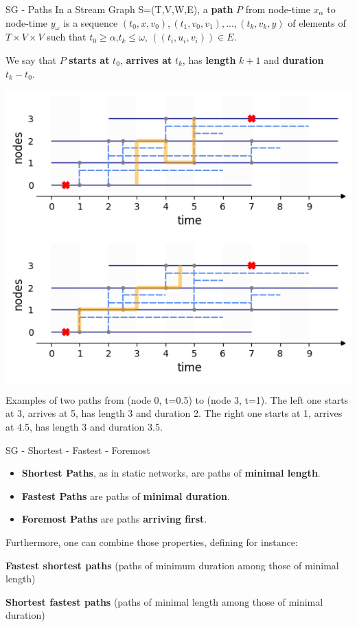 \documentclass[a4paper,11pt]{book}
\begin{document}
\begin{textbox}{SG - Paths}
In a Stream Graph S=(T,V,W,E), a \textbf{path} $P$ from node-time $x_\alpha$ to node-time $y_\omega$ is a sequence $(t_0,x,v_0),(t_1,v_0,v_1),...,(t_k,v_k,y)$ of elements of $T \times V \times V$ such that $t_0\geq \alpha$,$t_k\leq\omega$, $((t_i,u_i,v_i))\in E$. 

We say that $P$ \textbf{starts at} $t_0$, \textbf{arrives at} $t_k$, has \textbf{length} $k+1$ and \textbf{duration} $t_k-t_0$.

\centering
\colorbox{white}{\includegraphics[width=0.45\linewidth]{pics/dynamic/path1.png}}
\colorbox{white}{\includegraphics[width=0.45\linewidth]{pics/dynamic/path2.png}}

Examples of two paths from (node 0, t=0.5) to (node 3, t=1). The left one starts at 3, arrives at 5, has length 3 and duration 2. The right one starts at 1, arrives at 4.5, has length 3 and duration 3.5.
\end{textbox}


\begin{textbox}{SG - Shortest - Fastest - Foremost}
\begin{itemize}
    \item \textbf{Shortest Paths}, as in static networks, are paths of \textbf{minimal length}.
    \item \textbf{Fastest Paths} are paths of \textbf{minimal duration}.
    \item \textbf{Foremost Paths} are paths \textbf{arriving first}.
\end{itemize}

Furthermore, one can combine those properties, defining for instance:

\textbf{Fastest shortest paths} (paths of minimum duration among those of minimal length)

\textbf{Shortest fastest paths} (paths of minimal length among those of minimal duration)

\end{textbox}
\end{document}
